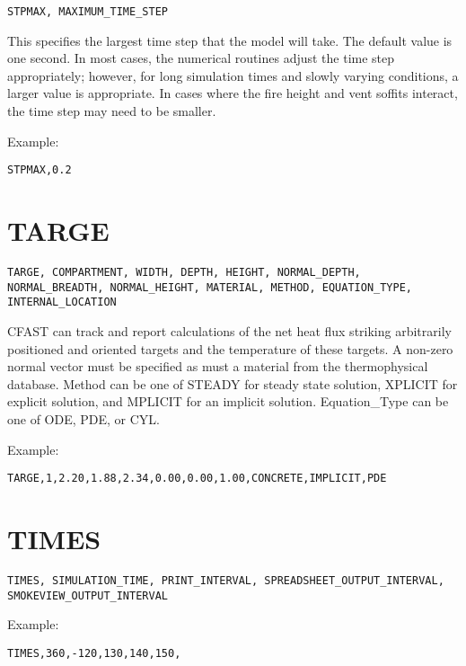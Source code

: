 \begin{lstlisting}
STPMAX, MAXIMUM_TIME_STEP
\end{lstlisting}

This specifies the largest time step that the model will take. The default value is one second. In most cases, the numerical routines adjust the time step appropriately; however, for long simulation times and slowly varying conditions, a larger value is appropriate. In cases where the fire height and vent soffits interact, the time step may need to be smaller.

Example:

\begin{lstlisting}
STPMAX,0.2
\end{lstlisting}

\section{TARGE}

\begin{lstlisting}
TARGE, COMPARTMENT, WIDTH, DEPTH, HEIGHT, NORMAL_DEPTH, NORMAL_BREADTH, NORMAL_HEIGHT, MATERIAL, METHOD, EQUATION_TYPE, INTERNAL_LOCATION
\end{lstlisting}

CFAST can track and report calculations of the net heat flux striking arbitrarily positioned and oriented targets and the temperature of these targets. A non-zero normal vector must be specified as must a material from the thermophysical database. Method can be one of STEADY for steady state solution, XPLICIT for explicit solution, and MPLICIT for an implicit solution. Equation\_Type can be one of ODE, PDE, or CYL.

Example:

\begin{lstlisting}
TARGE,1,2.20,1.88,2.34,0.00,0.00,1.00,CONCRETE,IMPLICIT,PDE
\end{lstlisting}

\section{TIMES}

\begin{lstlisting}
TIMES, SIMULATION_TIME, PRINT_INTERVAL, SPREADSHEET_OUTPUT_INTERVAL, SMOKEVIEW_OUTPUT_INTERVAL
\end{lstlisting}

Example:

\begin{lstlisting}
TIMES,360,-120,130,140,150,
\end{lstlisting}

